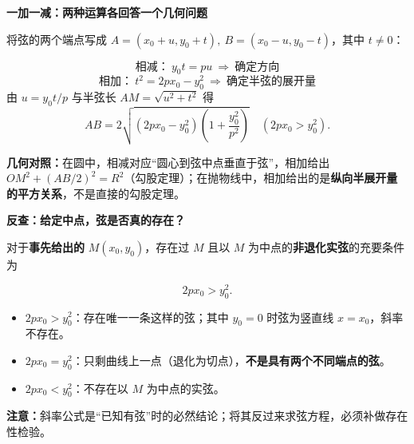 \begin{statementbox}
\par\medskip
\begin{minipage}{\linewidth}
\noindent
\textbf{\textcolor{CStatement}{一加一减：两种运算各回答一个几何问题}}\par\nobreak\smallskip
将弦的两个端点写成 $A=(x_0+u,y_0+t),\ B=(x_0-u,y_0-t)$，其中 $t\ne0$：\par
\end{minipage}
\par

\[
\boxed{\text{相减：}\ y_0t=pu\ \Longrightarrow\ \text{确定方向}}
\]
\[
\boxed{\text{相加：}\ t^2=2px_0-y_0^2\ \Longrightarrow\ \text{确定半弦的展开量}}
\]
由 $u=y_0t/p$ 与半弦长 $AM=\sqrt{u^2+t^2}$ 得
\[
\boxed{\displaystyle AB=2\sqrt{(2px_0-y_0^2)\!\left(1+\frac{y_0^2}{p^2}\right)}}\quad(2px_0>y_0^2).
\]
\par\noindent\textbf{几何对照：}在圆中，相减对应“圆心到弦中点垂直于弦”，相加给出 $OM^2+(AB/2)^2=R^2$（勾股定理）；在抛物线中，相加给出的是\textbf{纵向半展开量的平方关系}，不是直接的勾股定理。
\par\medskip
\begin{minipage}{\linewidth}
\noindent
\textbf{\textcolor{CStatement}{反查：给定中点，弦是否真的存在？}}\par\nobreak\smallskip
对于\textbf{事先给出的} $M(x_0,y_0)$，存在过 $M$ 且以 $M$ 为中点的\textbf{非退化实弦}的充要条件为\par
\end{minipage}
\par

\[\boxed{\displaystyle 2px_0>y_0^2}.\]
\begin{itemize}[leftmargin=*,itemsep=0.25em]
 \item $2px_0>y_0^2$：存在唯一一条这样的弦；其中 $y_0=0$ 时弦为竖直线 $x=x_0$，斜率不存在。
 \item $2px_0=y_0^2$：只剩曲线上一点（退化为切点），\textbf{不是具有两个不同端点的弦}。
 \item $2px_0<y_0^2$：不存在以 $M$ 为中点的实弦。
\end{itemize}
\par\noindent\textbf{注意：}斜率公式是“已知有弦”时的必然结论；将其反过来求弦方程，必须补做存在性检验。
\end{statementbox}

